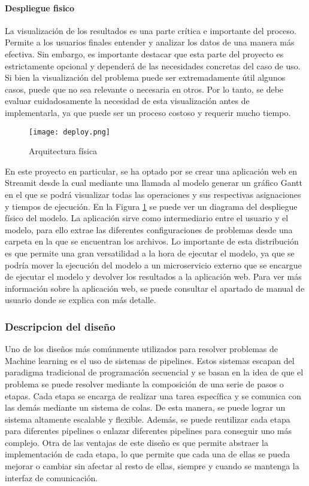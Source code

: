 \paragraph{Despliegue fisico}
La visualización de los resultados es una parte crítica e importante del proceso. Permite 
a los usuarios finales entender y analizar los datos de una manera más efectiva.  
Sin embargo, es importante destacar que esta parte del proyecto es 
estrictamente opcional y dependerá de las necesidades concretas del caso de uso. 
Si bien la visualización del problema puede ser extremadamente útil algunos casos, puede que no sea 
relevante o necesaria en otros. Por lo tanto, se debe evaluar cuidadosamente la necesidad de 
esta visualización antes de implementarla, ya que puede ser un proceso costoso y 
requerir mucho tiempo.\medskip

\begin{figure}[ht]
    \centering
    \texttt{[image: deploy.png]}
    \caption{Arquitectura física}
    \label{fig:despliegue}
\end{figure}

En este proyecto en particular, se ha optado por se crear una aplicación web en Streamit \cite{Streamlit} 
desde la cual mediante una llamada al modelo generar un gráfico Gantt en el que se podrá
visualizar todas las operaciones y sus respectivas asignaciones y tiempos de ejecución.
En la Figura \ref{fig:despliegue} se puede ver un diagrama del despliegue físico del modelo.
La aplicación sirve como intermediario entre el usuario y el modelo, para ello extrae las
diferentes configuraciones de problemas desde una carpeta en la que se encuentran los 
archivos. Lo importante de esta distribución es que permite una gran versatilidad a la hora
de ejecutar el modelo, ya que se podría mover la ejecución del modelo a un microservicio
externo que se encargue de ejecutar el modelo y devolver los resultados a la aplicación web.
Para ver más información sobre la aplicación web, se puede consultar el apartado de manual
de usuario donde se explica con más detalle. 

\subsubsection{Descripcion del diseño}
Uno de los diseños más comúnmente utilizados para resolver problemas de Machine learning
es el uso de sistemas de pipelines. Estos sistemas escapan del paradigma tradicional de
programación secuencial y se basan en la idea de que el problema se puede resolver
mediante la composición de una serie de pasos o etapas. Cada etapa se encarga de realizar
una tarea específica y se comunica con las demás mediante un sistema de colas. De esta
manera, se puede lograr un sistema altamente escalable y flexible. Además, se puede
reutilizar cada etapa para diferentes pipelines o enlazar diferentes pipelines para
conseguir uno más complejo. Otra de las ventajas de este diseño es que permite
abstraer la implementación de cada etapa, lo que permite que cada una de ellas se pueda
mejorar o cambiar sin afectar al resto de ellas, siempre y cuando se mantenga la
interfaz de comunicación.

